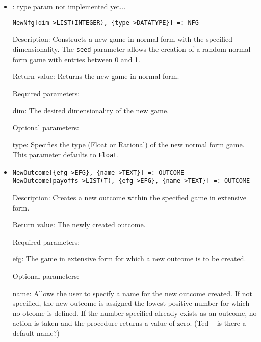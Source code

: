 \begin{itemize}
\item

: type param not implemented yet...
\protect \large \begin{verbatim}
NewNfg[dim->LIST(INTEGER), {type->DATATYPE}] =: NFG
\end{verbatim}\normalsize

\bd
\item
[Description:] Constructs a new game in normal form with the
specified dimensionality.  The \verb+seed+ parameter allows the creation
of a random normal form game with entries between 0 and 1.

\item
[Return value:] Returns the new game in normal form.
\item
[Required parameters:]\hfil\null
	
\bd
\item
[dim:] The desired dimensionality of the new game.
\ed

\item
[Optional parameters:]\hfil\null
	
\bd
\item
[type:] Specifies the type (Float or Rational) of the new normal form
game.  This parameter defaults to \verb+Float+.
\ed

\ed

\item
\protect \large \begin{verbatim} 
NewOutcome[{efg->EFG}, {name->TEXT}] =: OUTCOME
NewOutcome[payoffs->LIST(T), {efg->EFG}, {name->TEXT}] =: OUTCOME
\end{verbatim}\normalsize

\bd
\item
[Description:] Creates a new outcome within the specified game in
extensive form. 
\item
[Return value:] The newly created outcome. 
\item 
[Required parameters:]\hfil\null

\bd
\item
[efg:] The game in extensive form for which a new outcome is to be
created.
\ed

\item
[Optional parameters:]\hfil\null

\bd
\item
[name:] Allows the user to specify a name for the new outcome
created.  If not specified, the new outcome is assigned the lowest
positive number for which no otcome is defined.  If the number
specified already exists as an outcome, no action is taken and the
procedure returns a value of zero.  (Ted -- is there a default name?)
\ed
\ed


\end{itemize}

